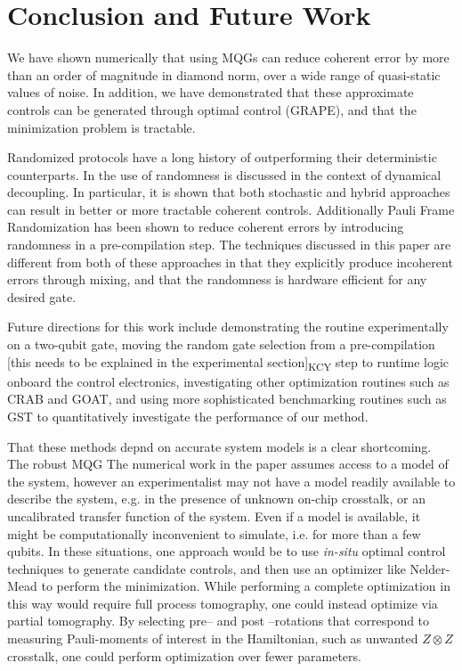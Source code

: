 \documentclass[aps,nofootinbib,pra,notitlepage,twocolumn]{revtex4-1}
\newcommand{\kcy}[1]{{\color{red}[#1]\textsubscript{\rm{KCY}}}}
\newcommand{\0}{\ensuremath{\mathbf{0}}}
\begin{document}
{\section{Conclusion and Future Work}
We have shown numerically that using MQGs can reduce coherent error by more than an order of magnitude in diamond norm, over a wide range of quasi-static values of noise. In addition, we have demonstrated that these approximate controls can be generated through optimal control (GRAPE), and that the minimization problem is tractable.

Randomized protocols have a long history of outperforming their deterministic counterparts. In \cite{Viola2005, Santos2006} the use of randomness is discussed in the context of dynamical decoupling. In particular, it is shown that both stochastic and hybrid approaches can result in better or more tractable coherent controls. Additionally Pauli Frame Randomization\cite{Wallman2016} has been shown \cite{1803.01818} to reduce coherent errors by introducing randomness in a pre-compilation step. The techniques discussed in this paper are different from both of these approaches in that they explicitly produce incoherent errors through mixing, and that the randomness is hardware efficient for any desired gate.

Future directions for this work include demonstrating the routine experimentally on a two-qubit gate, moving the random gate selection from a pre-compilation \kcy{this needs to be explained in the experimental section} step to runtime logic onboard the control electronics, investigating other optimization routines such as CRAB \cite{Caneva2011} and GOAT\cite{Machnes2018}, and using more sophisticated benchmarking routines such as GST\cite{BlumeKohout2017} to quantitatively investigate the performance of our method.

That these methods depnd on accurate system models is a clear shortcoming. The robust MQG The numerical work in the paper assumes access to a model of the system, however an experimentalist may not have a model readily available to describe the system, e.g. in the presence of unknown on-chip crosstalk, or an uncalibrated transfer function of the system. Even if a model is available, it might be computationally inconvenient to simulate, i.e. for more than a few qubits. In these situations, one approach would be to use \textit{in-situ} optimal control techniques \cite{Wu2018, Kelly2014, Ferrie2015} to generate candidate controls, and then use an optimizer like Nelder-Mead to perform the minimization. While performing a complete optimization in this way would require full process tomography, one could instead optimize via partial tomography. By selecting pre-- and post --rotations that correspond to measuring Pauli-moments of interest in the Hamiltonian, such as unwanted $Z\otimes Z$ crosstalk, one could perform optimization over fewer parameters.

}
\end{document}
